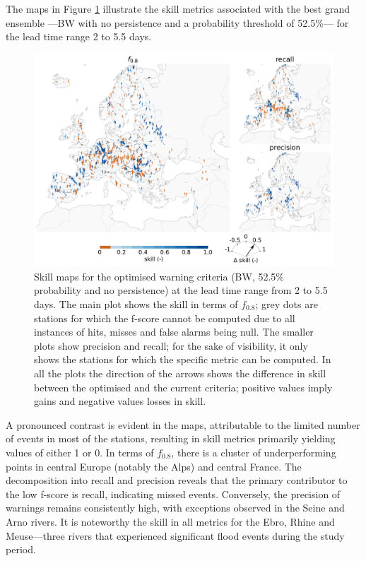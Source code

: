 \documentclass{ametsocV6.1}
\begin{document}
The maps in Figure \ref{fig:maps_BW} illustrate the skill metrics associated with the best grand ensemble —BW  with no persistence and a probability threshold of 52.5\%— for the lead time range 2 to 5.5 days.
\begin{figure}[ht]
    \centering
    \includegraphics[width=1\linewidth]{figure07.pdf}
    \caption{Skill maps for the optimised warning criteria (BW, 52.5\% probability  and no persistence) at the lead time range from 2 to 5.5 days. The main plot shows the skill in terms of $f_{0.8}$; grey dots are stations for which the f-score cannot be computed due to all instances of hits, misses and false alarms being null. The smaller plots show precision and recall; for the sake of visibility, it only shows the stations for which the specific metric can be computed. In all the plots the direction of the arrows shows the difference in skill between the optimised and the current criteria; positive values imply gains and negative values losses in skill.}
    \label{fig:maps_BW}
\end{figure}

A pronounced contrast is evident in the maps, attributable to the limited number of events in most of the stations, resulting in skill metrics primarily yielding values of either 1 or 0. In terms of $f_{0.8}$, there is a cluster of underperforming points in central Europe (notably the Alps) and central France. The decomposition into recall and precision reveals that the primary contributor to the low f-score is recall, indicating missed events. Conversely, the precision of warnings remains consistently high, with exceptions observed in the Seine and Arno rivers. It is noteworthy the skill in all metrics for the Ebro, Rhine and Meuse—three rivers that experienced significant flood events during the study period.
\end{document}
